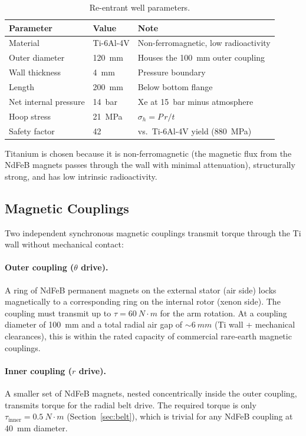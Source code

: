 \documentclass[11pt,a4paper]{article}
\begin{document}
\begin{table}[H]
\centering
\caption{Re-entrant well parameters.}
\label{tab:well}
\begin{tabular}{lll}
\toprule
Parameter & Value & Note \\
\midrule
Material             & Ti-6Al-4V & Non-ferromagnetic, low radioactivity \\
Outer diameter       & \SI{120}{mm} & Houses the \SI{100}{mm} outer coupling \\
Wall thickness       & \SI{4}{mm} & Pressure boundary \\
Length               & \SI{200}{mm} & Below bottom flange \\
Net internal pressure & \SI{14}{bar} & Xe at 15~bar minus atmosphere \\
Hoop stress          & \SI{21}{MPa} & $\sigma_h = P\,r/t$ \\
Safety factor        & 42 & vs.\ Ti-6Al-4V yield (\SI{880}{MPa}) \\
\bottomrule
\end{tabular}
\end{table}

Titanium is chosen because it is non-ferromagnetic (the magnetic flux
from the NdFeB magnets passes through the wall with minimal attenuation),
structurally strong, and has low intrinsic radioactivity.

\subsection{Magnetic Couplings}

Two independent synchronous magnetic couplings transmit torque through
the Ti wall without mechanical contact:

\paragraph{Outer coupling ($\theta$ drive).}
A ring of NdFeB permanent magnets on the external stator (air side)
locks magnetically to a corresponding ring on the internal rotor
(xenon side). The coupling must transmit up to $\tau = \SI{60}{N\cdot m}$
for the arm rotation. At a coupling diameter of \SI{100}{mm} and a total
radial air gap of $\sim\SI{6}{mm}$ (Ti wall + mechanical clearances),
this is within the rated capacity of commercial rare-earth magnetic
couplings.

\paragraph{Inner coupling ($r$ drive).}
A smaller set of NdFeB magnets, nested concentrically inside the outer
coupling, transmits torque for the radial belt drive. The required
torque is only $\tau_\mathrm{inner} = \SI{0.5}{N\cdot m}$
(Section~\ref{sec:belt}), which is trivial for any NdFeB coupling
at \SI{40}{mm} diameter.
\end{document}
